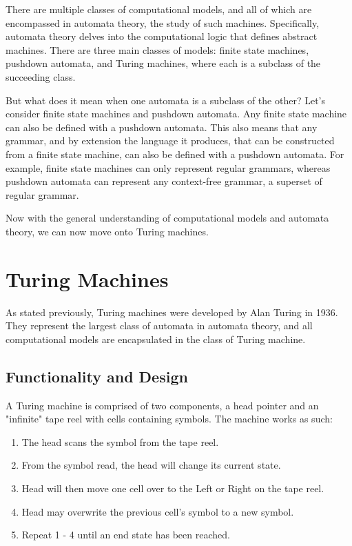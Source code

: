 \documentclass[12pt]{article}
\begin{document}
There are multiple classes of computational models, and all of which are encompassed in automata theory, the study of such machines. Specifically, automata theory delves into the computational logic that defines abstract machines. There are three main classes of models: finite state machines, pushdown automata, and Turing machines, where each is a subclass of the succeeding class. 

But what does it mean when one automata is a subclass of the other? Let's consider finite state machines and pushdown automata. Any finite state machine can also be defined with a pushdown automata. This also means that any grammar, and by extension the language it produces, that can be constructed from a finite state machine, can also be defined with a pushdown automata. For example, finite state machines can only represent regular grammars, whereas pushdown automata can represent any context-free grammar, a superset of regular grammar. 

Now with the general understanding of computational models and automata theory, we can now move onto Turing machines.


\section{Turing Machines}

As stated previously, Turing machines were developed by Alan Turing in 1936. They represent the largest class of automata in automata theory, and all computational models are encapsulated in the class of Turing machine.

\subsection{Functionality and Design}
 A Turing machine is comprised of two components, a head pointer and an "infinite" tape reel with cells containing symbols. The machine works as such: 
\begin{enumerate}

\item The head scans the symbol from the tape reel.
\item From the symbol read, the head will change its current state.
\item Head will then move one cell over to the Left or Right on the tape reel.
\item Head may overwrite the previous cell's symbol to a new symbol.
\item Repeat 1 - 4 until an end state has been reached.

\end{enumerate}
\end{document}
